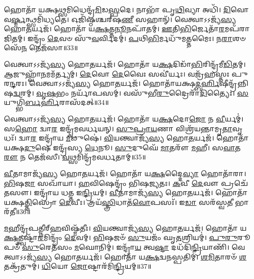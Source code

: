 𑌹𑍋𑌤𑌾᳴ 𑌯𑌕𑍍𑌷\-\ul{𑌥𑍍𑌸}\-𑌮𑌿𑌧𑍇𑌨𑍍𑌦𑍍𑌰᳴\-\ul{𑌮𑌿}\-𑌡\-\ul{𑌸𑍍𑌪}\-𑌦𑍇।
𑌨𑌾𑌭𑌾᳴ 𑌪𑍃\-\ul{𑌥𑌿}\-𑌵𑍍𑌯𑌾 𑌅𑌧𑌿᳴।
\-\ul{𑌦𑌿}\-𑌵𑍋 𑌵\-\ul{𑌰𑍍𑌷𑍍𑌮}\-𑌨𑍍𑌥𑍍𑌸𑌮𑌿᳴𑌧𑍍𑌯𑌤𑍇।
𑌓𑌜𑌿᳴𑌷𑍍𑌠𑌶𑍍𑌚𑌰𑍍‌\mbox{}𑌷\-\ul{𑌣𑍀} 𑌸𑌹𑌾𑌨𑍍᳴।
𑌵𑍇𑌤𑍍𑌵𑌾𑌽𑌽𑌜𑍍𑌯᳴\-\ul{𑌸𑍍𑌯} 𑌹𑍋\-\ul{𑌤}\-𑌰𑍍𑌯𑌜᳴।
𑌹𑍋𑌤𑌾᳴ 𑌯\-\ul{𑌕𑍍𑌷}\-𑌤𑍍𑌤\-\ul{𑌨𑍂}\-𑌨𑌪𑌾᳴𑌤𑌮𑍍।
\-\ul{𑌊}\-𑌤𑌿\-\ul{𑌭𑌿}\-𑌰𑍍𑌜𑍇𑌤𑌾᳴\-\ul{𑌰}\-𑌮𑌪᳴𑌰𑌾𑌜𑌿𑌤𑌮𑍍।
𑌇𑌨𑍍𑌦𑍍𑌰𑌂᳴ \ul{𑌦𑍇}\-𑌵𑍞 𑌸𑍁᳴\-\ul{𑌵}\-𑌰𑍍𑌵𑌿𑌦𑌮𑍍॑।
\-\ul{𑌪}\-𑌥𑌿\-\ul{𑌭𑌿}\-𑌰𑍍𑌮𑌧𑍁᳴𑌮𑌤𑍍𑌤𑌮𑍈𑌃।
𑌨\-\ul{𑌰𑌾}\-𑌶𑍞𑌸𑍇᳴\-\ul{𑌨} 𑌤𑍇𑌜᳴𑌸𑌾॥33॥

𑌵𑍇𑌤𑍍𑌵𑌾𑌽𑌽𑌜𑍍𑌯᳴\-\ul{𑌸𑍍𑌯} 𑌹𑍋\-\ul{𑌤}\-𑌰𑍍𑌯𑌜᳴।
𑌹𑍋𑌤𑌾᳴ 𑌯\-\ul{𑌕𑍍𑌷}\-𑌦𑌿𑌡𑌾᳴\-\ul{𑌭𑌿}\-𑌰𑌿𑌨𑍍𑌦𑍍𑌰᳴𑌮𑍀\-\ul{𑌡𑌿}\-𑌤𑌮𑍍।
\-\ul{𑌆}\-𑌜𑍁𑌹𑍍𑌵𑌾᳴\-\ul{𑌨}\-𑌮𑌮᳴𑌰𑍍𑌤𑍍𑌯𑌮𑍍।
\-\ul{𑌦𑍇}\-𑌵𑍋 \ul{𑌦𑍇}\-𑌵𑍈𑌃 𑌸𑌵𑍀॑𑌰𑍍𑌯𑌃।
𑌵𑌜𑍍𑌰᳴𑌹𑌸𑍍𑌤𑌃 𑌪𑍁𑌰\-\ul{𑌨𑍍𑌦}\-𑌰𑌃।
𑌵𑍇𑌤𑍍𑌵𑌾𑌽𑌽𑌜𑍍𑌯᳴\-\ul{𑌸𑍍𑌯} 𑌹𑍋\-\ul{𑌤}\-𑌰𑍍𑌯𑌜᳴।
𑌹𑍋𑌤𑌾᳴𑌯𑌕𑍍𑌷\-\ul{𑌦𑍍𑌬}\-\-\ul{𑌰𑍍}\-𑌹𑌿𑌷𑍀𑌨𑍍𑌦𑍍𑌰᳴𑌨𑍍𑌨𑌿𑌷\-\ul{𑌦𑍍𑌵}\-𑌰𑌮𑍍।
\-\ul{𑌵𑍃}\-\-\ul{𑌷}\-𑌭𑌂 𑌨𑌰𑍍𑌯𑌾᳴𑌪𑌸𑌮𑍍।
𑌵𑌸𑍁᳴𑌭𑍀\-\ul{𑌰𑍁}\-𑌦𑍍𑌰𑍈𑌰𑌾᳴\-\ul{𑌦𑌿}\-𑌤𑍍𑌯𑍈𑌃।
\-\ul{𑌸}\-𑌯𑍁𑌗𑍍𑌭𑌿᳴\-\ul{𑌰𑍍𑌬}\-\-\ul{𑌰𑍍}\-𑌹𑌿𑌰𑌾\-𑌸᳴𑌦𑌤𑍍॥34॥

𑌵𑍇𑌤𑍍𑌵𑌾𑌽𑌽𑌜𑍍𑌯᳴\-\ul{𑌸𑍍𑌯} 𑌹𑍋\-\ul{𑌤}\-𑌰𑍍𑌯𑌜᳴।
𑌹𑍋𑌤𑌾᳴ 𑌯\-\ul{𑌕𑍍𑌷}\-𑌦𑍋\-\ul{𑌜𑍋} 𑌨 \ul{𑌵𑍀}\-𑌰𑍍𑌯𑌮𑍍॑।
𑌸\-\ul{𑌹𑍋} 𑌦𑍍𑌵𑌾\-\ul{𑌰} 𑌇𑌨𑍍𑌦𑍍𑌰᳴𑌮𑌵𑌰𑍍𑌧𑌯𑌨𑍍।
\-\ul{𑌸𑍁}\-\-\ul{𑌪𑍍𑌰𑌾}\-\-\ul{𑌯}\-𑌣𑌾 𑌵𑌿𑌶𑍍𑌰᳴𑌯𑌨𑍍𑌤𑌾𑌮𑍃\-\ul{𑌤𑌾}\-𑌵𑍃𑌧𑌃᳴।
𑌦𑍍𑌵𑌾\-\ul{𑌰} 𑌇𑌨𑍍𑌦𑍍𑌰𑌾᳴𑌯 \ul{𑌮𑍀}\-𑌢𑍁𑌷𑍇॑।
\-\ul{𑌵𑌿}\-𑌯𑌨𑍍𑌤𑍍𑌵𑌾𑌜𑍍𑌯᳴\-\ul{𑌸𑍍𑌯} 𑌹𑍋\-\ul{𑌤}\-𑌰𑍍𑌯𑌜᳴।
𑌹𑍋𑌤𑌾᳴ 𑌯𑌕𑍍𑌷\-\ul{𑌦𑍁}\-𑌷𑍇 𑌇𑌨𑍍𑌦𑍍𑌰᳴𑌸𑍍𑌯 \ul{𑌧𑍇}\-𑌨𑍂।
\-\ul{𑌸𑍁}\-𑌦𑍁𑌘𑍇᳴ \ul{𑌮𑌾}\-𑌤𑌰𑍗᳴ \ul{𑌮}\-𑌹𑍀।
𑌸\-\ul{𑌵𑌾}\-𑌤\-\ul{𑌰𑍗} 𑌨 𑌤𑍇𑌜᳴𑌸𑍀।
\-\ul{𑌵}\-𑌥𑍍𑌸𑌮𑌿𑌨𑍍𑌦𑍍𑌰᳴𑌮𑌵𑌰𑍍𑌧𑌤𑌾𑌮𑍍॥35॥

\-\ul{𑌵𑍀}\-𑌤𑌾𑌮𑌾𑌜𑍍𑌯᳴\-\ul{𑌸𑍍𑌯} 𑌹𑍋\-\ul{𑌤}\-𑌰𑍍𑌯𑌜᳴।
𑌹𑍋𑌤𑌾᳴ 𑌯\-\ul{𑌕𑍍𑌷}\-𑌦𑍍𑌦𑍈\-\ul{𑌵𑍍𑌯𑌾} 𑌹𑍋𑌤𑌾᳴𑌰𑌾।
\-\ul{𑌭𑌿}\-𑌷\-\ul{𑌜𑌾} 𑌸𑌖𑌾᳴𑌯𑌾।
\-\ul{𑌹}\-𑌵𑌿𑌷𑍇𑌨𑍍𑌦𑍍𑌰𑌂᳴ 𑌭𑌿𑌷𑌜𑍍𑌯𑌤𑌃।
\-\ul{𑌕}\-𑌵𑍀 \ul{𑌦𑍇}\-𑌵𑍗 𑌪𑍍𑌰𑌚𑍇᳴𑌤𑌸𑍗।
𑌇𑌨𑍍𑌦𑍍𑌰𑌾᳴𑌯 𑌧𑌤𑍍𑌤 𑌇\-\ul{𑌨𑍍𑌦𑍍𑌰𑌿}\-𑌯𑌮𑍍।
\-\ul{𑌵𑍀}\-𑌤𑌾𑌮𑌾𑌜𑍍𑌯᳴\-\ul{𑌸𑍍𑌯} 𑌹𑍋\-\ul{𑌤}\-𑌰𑍍𑌯𑌜᳴।
𑌹𑍋𑌤𑌾᳴ 𑌯𑌕𑍍𑌷\-\ul{𑌤𑍍𑌤𑌿}\-𑌸𑍍𑌰𑍋 \ul{𑌦𑍇}\-𑌵𑍀𑌃।
𑌤𑍍𑌰𑌯᳴\-\ul{𑌸𑍍𑌤𑍍𑌰𑌿}\-𑌧𑌾𑌤᳴\-\ul{𑌵𑍋}\-𑌪𑌸𑌃᳴।
𑌇\-\ul{𑌡𑌾} 𑌸𑌰᳴𑌸𑍍𑌵\-\ul{𑌤𑍀} 𑌭𑌾𑌰᳴𑌤𑍀॥36॥

\-\ul{𑌮}\-𑌹𑍀𑌨𑍍𑌦𑍍𑌰᳴𑌪𑌤𑍍𑌨𑍀𑌰𑍍‌\mbox{}\-\ul{𑌹}\-𑌵𑌿𑌷𑍍𑌮᳴𑌤𑍀𑌃।
\-\ul{𑌵𑌿}\-𑌯𑌨𑍍𑌤𑍍𑌵𑌾𑌜𑍍𑌯᳴\-\ul{𑌸𑍍𑌯} 𑌹𑍋\-\ul{𑌤}\-𑌰𑍍𑌯𑌜᳴।
𑌹𑍋𑌤𑌾᳴ 𑌯\-\ul{𑌕𑍍𑌷}\-𑌤𑍍𑌤𑍍𑌵𑌷𑍍𑌟𑌾᳴\-\ul{𑌰}\-𑌮𑌿𑌨𑍍𑌦𑍍𑌰𑌂᳴ \ul{𑌦𑍇}\-𑌵𑌮𑍍।
\-\ul{𑌭𑌿}\-𑌷𑌜𑍞᳴ \ul{𑌸𑍁}\-𑌯𑌜𑌂᳴ 𑌘𑍃\-\ul{𑌤}\-𑌶𑍍𑌰𑌿𑌯𑌮𑍍॑।
\-\ul{𑌪𑍁}\-\-\ul{𑌰𑍁}\-𑌰𑍂𑌪𑍞᳴ \ul{𑌸𑍁}\-𑌰𑍇𑌤᳴𑌸𑌂 \ul{𑌮}\-𑌘𑍋𑌨𑌿𑌮𑍍॑।
𑌇𑌨𑍍𑌦𑍍𑌰𑌾᳴\-\ul{𑌯} 𑌤𑍍𑌵\-\ul{𑌷𑍍𑌟𑌾} 𑌦𑌧᳴𑌦𑌿\-\ul{𑌨𑍍𑌦𑍍𑌰𑌿}\-𑌯𑌾𑌣𑌿᳴।
𑌵𑍇𑌤𑍍𑌵𑌾𑌽𑌽𑌜𑍍𑌯᳴\-\ul{𑌸𑍍𑌯} 𑌹𑍋\-\ul{𑌤}\-𑌰𑍍𑌯𑌜᳴।
𑌹𑍋𑌤𑌾᳴ 𑌯\-\ul{𑌕𑍍𑌷}\-𑌦𑍍𑌵\-\ul{𑌨}\-𑌸𑍍𑌪𑌤𑌿𑌮𑍍॑।
\-\ul{𑌶}\-\-\ul{𑌮𑌿}\-𑌤𑌾𑌰𑍞᳴ \ul{𑌶}\-𑌤𑌕𑍍𑌰᳴𑌤𑍁𑌮𑍍।
\-\ul{𑌧𑌿}\-𑌯𑍋 \ul{𑌜𑍋}\-𑌷𑍍𑌟𑌾𑌰᳴𑌮𑌿\-\ul{𑌨𑍍𑌦𑍍𑌰𑌿}\-𑌯𑌮𑍍॥37॥

